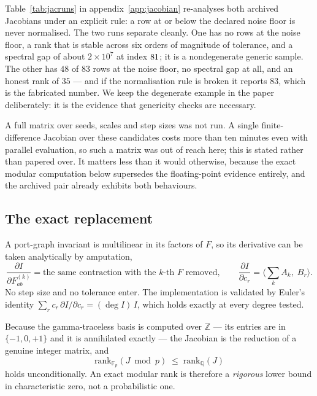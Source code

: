 \documentclass[11pt,a4paper]{article}
\begin{document}
Table~\ref{tab:jacruns} in appendix~\ref{app:jacobian} re-analyses both archived
Jacobians under an explicit rule: a row at or below the declared noise floor is
never normalised. The two runs separate cleanly. One has no rows at the noise
floor, a rank that is stable across six orders of magnitude of tolerance, and a
spectral gap of about $2\times 10^{7}$ at index $81$; it is a
nondegenerate generic sample. The other has $48$ of $83$ rows at the noise floor,
no spectral gap at all, and an honest rank of $35$ --- and if the normalisation
rule is broken it reports $83$, which is the fabricated number. We keep the
degenerate example in the paper deliberately: it is the evidence that genericity
checks are necessary.

A full matrix over seeds, scales and step sizes was not run. A single
finite-difference Jacobian over these candidates costs more than ten minutes even
with parallel evaluation, so such a matrix was out of reach here; this is stated
rather than papered over. It matters less than it would otherwise, because the
exact modular computation below supersedes the floating-point evidence entirely,
and the archived pair already exhibits both behaviours.

\subsection{The exact replacement}

A port-graph invariant is multilinear in its factors of $F$, so its derivative
can be taken analytically by amputation,
\begin{equation}
  \frac{\partial I}{\partial F^{(k)}_{ab}}
  = \text{the same contraction with the $k$-th $F$ removed},
  \qquad
  \frac{\partial I}{\partial c_r} = \Big\langle \sum_k A_k,\; B_r \Big\rangle .
\end{equation}
No step size and no tolerance enter. The implementation is validated by Euler's
identity $\sum_r c_r\,\partial I/\partial c_r = (\deg I)\,I$, which holds exactly
at every degree tested.

Because the gamma-traceless basis is computed over $\mathbb{Z}$ --- its entries
are in $\{-1,0,+1\}$ and it is annihilated exactly --- the Jacobian is the
reduction of a genuine integer matrix, and
\begin{equation}
  \mathrm{rank}_{\mathbb{F}_p}(J \bmod p) \;\le\; \mathrm{rank}_{\mathbb{Q}}(J)
\end{equation}
holds unconditionally. An exact modular rank is therefore a \emph{rigorous} lower
bound in characteristic zero, not a probabilistic one.
\end{document}
